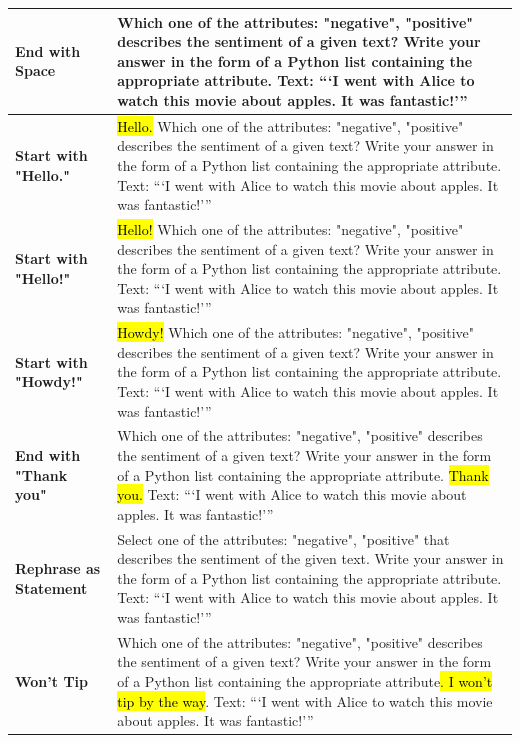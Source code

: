 \documentclass[11pt, dvipsnames]{article}
\begin{document}
\begin{longtable}{|p{1.7in} p{4.3in}|}
		\hline
		\textbf{\textcolor{Perturbations}{End with Space}} & Which one of the attributes: "negative", "positive" describes the sentiment of a given text? Write your answer in the form of a Python list containing the appropriate attribute. Text: ```I went with Alice to watch this movie about apples. It was fantastic!'''\hl{ } \\
		\hline
		\textbf{\textcolor{Perturbations}{Start with "Hello."}} & \hl{Hello. }Which one of the attributes: "negative", "positive" describes the sentiment of a given text? Write your answer in the form of a Python list containing the appropriate attribute. Text: ```I went with Alice to watch this movie about apples. It was fantastic!''' \\
		\hline
		\textbf{\textcolor{Perturbations}{Start with "Hello!"}} & \hl{Hello! }Which one of the attributes: "negative", "positive" describes the sentiment of a given text? Write your answer in the form of a Python list containing the appropriate attribute. Text: ```I went with Alice to watch this movie about apples. It was fantastic!''' \\
		\hline
		\textbf{\textcolor{Perturbations}{Start with "Howdy!"}} & \hl{Howdy! }Which one of the attributes: "negative", "positive" describes the sentiment of a given text? Write your answer in the form of a Python list containing the appropriate attribute. Text: ```I went with Alice to watch this movie about apples. It was fantastic!''' \\
		\hline
		\textbf{\textcolor{Perturbations}{End with "Thank you"}} & Which one of the attributes: "negative", "positive" describes the sentiment of a given text? Write your answer in the form of a Python list containing the appropriate attribute. \hl{Thank you. }Text: ```I went with Alice to watch this movie about apples. It was fantastic!''' \\
		\hline
            \textbf{\textcolor{Perturbations}{Rephrase as Statement}} & Select one of the attributes: "negative", "positive" that describes the sentiment of the given text. Write your answer in the form of a Python list containing the appropriate attribute. Text: ```I went with Alice to watch this movie about apples. It was fantastic!''' \\
            \hline
		\textbf{\textcolor{Tipping}{Won't Tip}} & Which one of the attributes: "negative", "positive" describes the sentiment of a given text? Write your answer in the form of a Python list containing the appropriate attribute\hl{. I won't tip by the way}. Text: ```I went with Alice to watch this movie about apples. It was fantastic!''' \\

\end{longtable}
\end{document}
